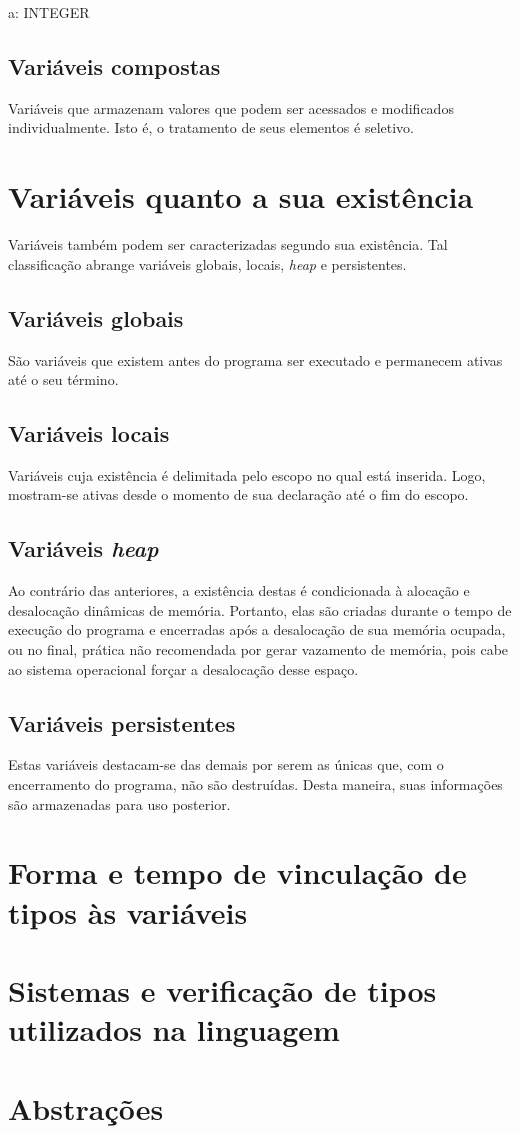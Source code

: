 \documentclass[brazil,times]{abnt}
\begin{document}
a: INTEGER

\section{Variáveis compostas}
Variáveis que armazenam valores que podem ser acessados e modificados individualmente. Isto é, o tratamento de seus elementos é seletivo.


\chapter{Variáveis quanto a sua existência}
Variáveis também podem ser caracterizadas segundo sua existência. Tal classificação abrange variáveis globais, locais, \textit{heap} e persistentes.

\section{Variáveis globais}
São variáveis que existem antes do programa ser executado e permanecem ativas até o seu término.

\section{Variáveis locais}
Variáveis cuja existência é delimitada pelo escopo no qual está inserida. Logo, mostram-se ativas desde o momento de sua declaração até o fim do escopo.

\section{Variáveis \textit{heap}}
Ao contrário das anteriores, a existência destas é condicionada à alocação e desalocação dinâmicas de memória. Portanto, elas são criadas durante o tempo de execução do programa e encerradas após a desalocação de sua memória ocupada, ou no final, prática não recomendada por gerar vazamento de memória, pois cabe ao sistema operacional forçar a desalocação desse espaço.

\section{Variáveis persistentes}
Estas variáveis destacam-se das demais por serem as únicas que, com o encerramento do programa, não são destruídas. Desta maneira, suas informações são armazenadas para uso posterior.


\chapter{Forma e tempo de vinculação de tipos às variáveis}


\chapter{Sistemas e verificação de tipos utilizados na linguagem}


\chapter{Abstrações}



\end{document}
